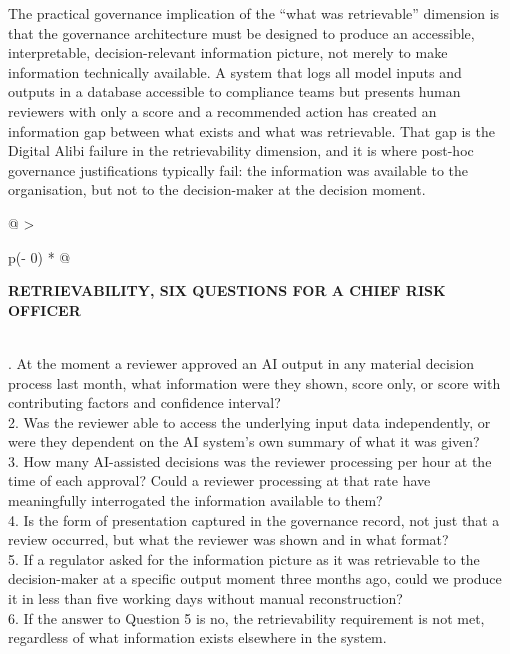 The practical governance implication of the ``what was retrievable'' dimension is that the governance architecture must be designed to produce an accessible, interpretable, decision-relevant information picture, not merely to make information technically available. A system that logs all model inputs and outputs in a database accessible to compliance teams but presents human reviewers with only a score and a recommended action has created an information gap between what exists and what was retrievable. That gap is the Digital Alibi failure in the retrievability dimension, and it is where post-hoc governance justifications typically fail: the information was available to the organisation, but not to the decision-maker at the decision moment.

\begin{longtable}[]{@{}
  >{\raggedright\arraybackslash}p{(\columnwidth - 0\tabcolsep) * }@{}}
\toprule\noalign{}
\begin{minipage}[b]{\linewidth}\raggedright
\textbf{RETRIEVABILITY, SIX QUESTIONS FOR A CHIEF RISK OFFICER}
\end{minipage} \\
\midrule\noalign{}
\endhead
\bottomrule\noalign{}
. At the moment a reviewer approved an AI output in any material decision process last month, what information were they shown, score only, or score with contributing factors and confidence interval? \\
2. Was the reviewer able to access the underlying input data independently, or were they dependent on the AI system's own summary of what it was given? \\
3. How many AI-assisted decisions was the reviewer processing per hour at the time of each approval? Could a reviewer processing at that rate have meaningfully interrogated the information available to them? \\
4. Is the form of presentation captured in the governance record, not just that a review occurred, but what the reviewer was shown and in what format? \\
5. If a regulator asked for the information picture as it was retrievable to the decision-maker at a specific output moment three months ago, could we produce it in less than five working days without manual reconstruction? \\
6. If the answer to Question 5 is no, the retrievability requirement is not met, regardless of what information exists elsewhere in the system. \\
\end{longtable}

